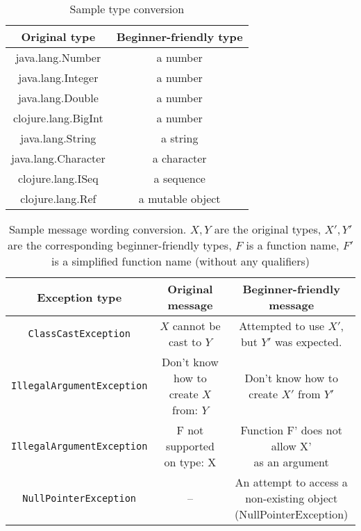 \documentclass[submission,copyright,creativecommons]{eptcs}
\begin{document}
\begin{table}[t]
\centering
\begin{tabular}{|c|c|}
\hline
Original type & Beginner-friendly type \\
\hline
java.lang.Number & a number \\
java.lang.Integer & a number \\
java.lang.Double  & a number \\
clojure.lang.BigInt  & a number \\
java.lang.String & a string \\
java.lang.Character & a character \\
clojure.lang.ISeq & a sequence \\
clojure.lang.Ref  & a mutable object \\
\hline
\end{tabular}
\caption{Sample type conversion}\label{table:types}
\end{table}
\begin{table}
\begin{tabular}{|c|c|c|}
\hline
Exception type & Original message & Beginner-friendly message \\
\hline 
{\tt ClassCastException} & $X$ cannot be cast to $Y$ & {\parbox{5cm}{Attempted to use $X'$, \\ 
but $Y'$ was expected.}} \\[0.3cm]
\hline
{\tt IllegalArgumentException} & 
Don't know how to create $X$ from:  $Y$ & 
{\parbox{5cm}{Don't know how to \\ create  $X'$ from $Y'$}} \\[0.3cm]
\hline
{\tt IllegalArgumentException} & F not supported on type: X &
{\parbox{5cm}{Function F' does not allow X' 
\\ as an argument}} \\[0.3cm]
\hline
{\tt NullPointerException} & -- &  {\parbox{5cm}{An attempt to access a 
\\ non-existing object
\\ (NullPointerException)}} \\[0.3cm]
\hline
\end{tabular}
\caption{Sample message wording conversion. $X,Y$ are the original types, $X',Y'$ are the corresponding beginner-friendly types, $F$ is a function name, $F'$ is a simplified function name (without any qualifiers)}\label{table:messages}
\end{table}
\end{document}
